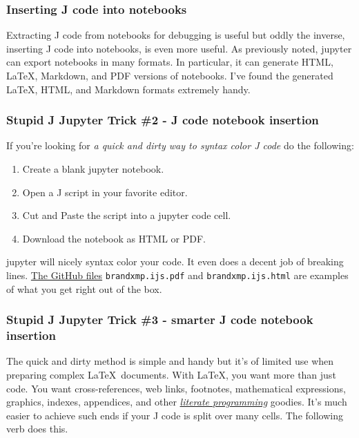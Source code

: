 \subsubsection*{Inserting J code into
notebooks}%

Extracting J code from notebooks for debugging is useful but oddly the
inverse, inserting J code into notebooks, is even more useful. As
previously noted, jupyter can export notebooks in many formats. In
particular, it can generate HTML, \LaTeX, Markdown, and PDF versions of
notebooks. I've found the generated \LaTeX, HTML, and Markdown formats
extremely handy.

\subsubsection*{Stupid J Jupyter Trick \#2 - J code notebook
insertion}%

If you're looking for \emph{a quick and dirty way to syntax color J
code} do the following:

\begin{enumerate}
\def\labelenumi{\arabic{enumi}.}
\tightlist
\item
  Create a blank jupyter notebook.
\item
  Open a J script in your favorite editor.
\item
  Cut and Paste the script into a jupyter code cell.
\item
  Download the notebook as HTML or PDF.
\end{enumerate}

jupyter will nicely syntax color your code. It even does a decent job of
breaking lines. \href{https://github.com/bakerjd99/jacks/tree/master/brandxmp/jupyter}{The GitHub files}
\texttt{brandxmp.ijs.pdf} and \texttt{brandxmp.ijs.html} are examples of what you get right out of the box.

\subsubsection*{Stupid J Jupyter Trick \#3 - smarter J code notebook
insertion}%

The quick and dirty method is simple and handy but it's of limited use
when preparing complex \LaTeX\ documents. With \LaTeX, you want more than
just code. You want cross-references, web links, footnotes, mathematical
expressions, graphics, indexes, appendices, and other
\href{https://www-cs-faculty.stanford.edu/~knuth/lp.html}{\emph{literate
programming}} goodies. It's much easier to achieve such ends if your J
code is split over many cells. The following verb does this.


